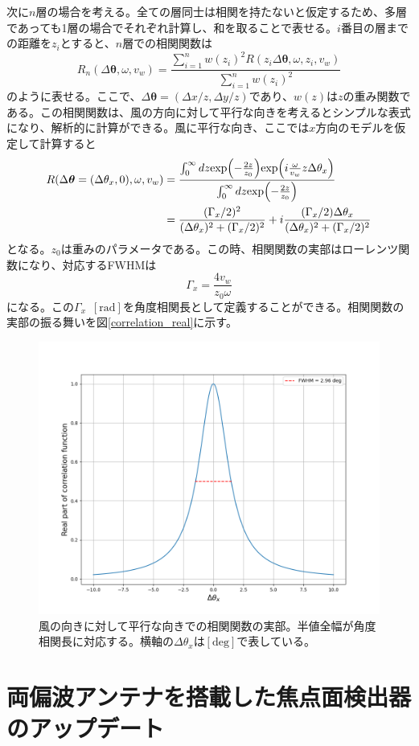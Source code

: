 次に$n$層の場合を考える。全ての層同士は相関を持たないと仮定するため、多層であっても1層の場合でそれぞれ計算し、和を取ることで表せる。$i$番目の層までの距離を$z_{i}$とすると、$n$層での相関関数は
\begin{equation}
  R_{n}(\Delta\bm{\theta},\omega,v_{w}) = \frac{\displaystyle\sum_{i=1}^{n}w(z_{i})^{2}R(z_{i}\Delta\bm{\theta},\omega,z_{i},v_{w})}{\displaystyle\sum_{i=1}^{n}w(z_{i})^{2}}
\end{equation}
のように表せる。ここで、$\Delta\bm{\theta} = (\Delta x/z, \Delta y/z)$であり、$w(z)$は$z$の重み関数である。この相関関数は、風の方向に対して平行な向きを考えるとシンプルな表式になり、解析的に計算ができる。風に平行な向き、ここでは$x$方向のモデルを仮定して計算すると
\begin{align}
  R(\Delta\bm{\theta} = (\Delta\theta_{x}, 0), \omega, v_{w}) &= \frac{\int_{0}^{\infty}dz\mathrm{exp}\Bigl(-\frac{2z}{z_{0}}\Bigr)\mathrm{exp}\Bigl(i\frac{\omega}{v_{w}}z\Delta\theta_{x}\Bigr)}{\int_{0}^{\infty}dz\mathrm{exp}\Bigl(-\frac{2z}{z_{0}}\Bigr)} \\
  &= \frac{(\Gamma_{x}/2)^{2}}{(\Delta\theta_{x})^{2} + (\Gamma_{x}/2)^{2}} + i\frac{(\Gamma_{x}/2)\Delta\theta_{x}}{(\Delta\theta_{x})^{2} + (\Gamma_{x}/2)^{2}}
\end{align}
となる。$z_{0}$は重みのパラメータである。この時、相関関数の実部はローレンツ関数になり、対応するFWHMは
\begin{equation}
  \Gamma_{x} = \frac{4v_{w}}{z_{0}\omega}
\end{equation}
になる。この$\Gamma_{x}$~$[\mathrm{rad}]$を角度相関長として定義することができる。相関関数の実部の振る舞いを図\ref{correlation_real}に示す。
\begin{figure}[htbp]
  \centering
  \includegraphics[width=0.8\columnwidth]{6_prospect/figs/correlation_real.png}
  \caption{風の向きに対して平行な向きでの相関関数の実部。半値全幅が角度相関長に対応する。横軸の$\Delta\theta_{x}$は$[\mathrm{deg}]$で表している。}
  \label{corelation_real}
\end{figure}
\section{両偏波アンテナを搭載した焦点面検出器のアップデート}



